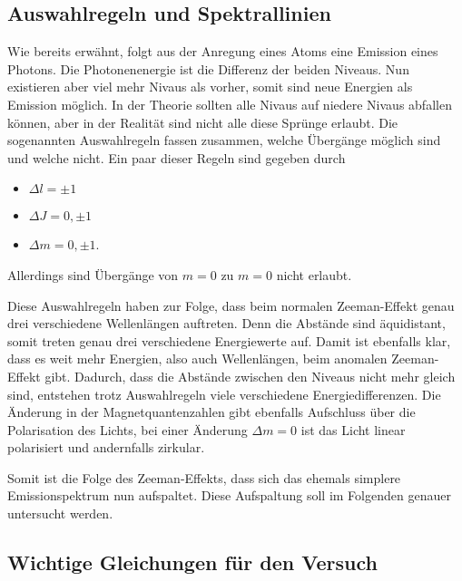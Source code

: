 \subsection{Auswahlregeln und Spektrallinien}
\label{ssec:theo5}

Wie bereits erwähnt, folgt aus der Anregung eines Atoms eine Emission eines Photons.
Die Photonenenergie ist die Differenz der beiden Niveaus.
Nun existieren aber viel mehr Nivaus als vorher, somit sind neue Energien als Emission möglich. 
In der Theorie sollten alle Nivaus auf niedere Nivaus abfallen können, aber in der Realität sind nicht alle diese Sprünge erlaubt.
Die sogenannten Auswahlregeln fassen zusammen, welche Übergänge möglich sind und welche nicht.
Ein paar dieser Regeln sind gegeben durch
\begin{itemize} 
    \item $\Delta l = \pm 1$
    \item $\Delta J = 0, \pm 1$
    \item $\Delta m = 0, \pm 1$.
\end{itemize}
Allerdings sind Übergänge von $m = 0$ zu $m = 0$ nicht erlaubt.

Diese Auswahlregeln haben zur Folge, dass beim normalen Zeeman-Effekt genau drei verschiedene Wellenlängen auftreten. 
Denn die Abstände sind äquidistant, somit treten genau drei verschiedene Energiewerte auf.
Damit ist ebenfalls klar, dass es weit mehr Energien, also auch Wellenlängen, beim anomalen Zeeman-Effekt gibt.
Dadurch, dass die Abstände zwischen den Niveaus nicht mehr gleich sind, entstehen trotz Auswahlregeln viele verschiedene Energiedifferenzen.
Die Änderung in der Magnetquantenzahlen gibt ebenfalls Aufschluss über die Polarisation des Lichts, bei einer Änderung $\Delta m = 0$ ist das Licht linear polarisiert und andernfalls zirkular.

Somit ist die Folge des Zeeman-Effekts, dass sich das ehemals simplere Emissionspektrum nun aufspaltet.
Diese Aufspaltung soll im Folgenden genauer untersucht werden. 

\subsection{Wichtige Gleichungen für den Versuch}
\label{ssec:theo6}

